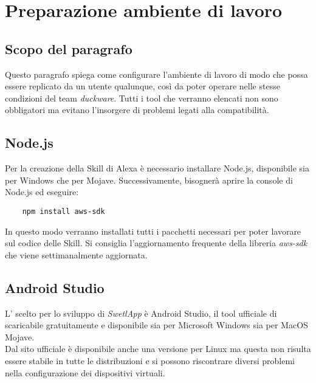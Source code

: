 \pagebreak

\section{Preparazione ambiente di lavoro}
\label{sec:ambientelavoro}
\subsection{Scopo del paragrafo}
Questo paragrafo spiega come configurare l'ambiente di lavoro di modo che possa essere replicato da un utente qualunque, così da poter operare nelle stesse condizioni del team \textit{duckware}. Tutti i tool che verranno elencati non sono obbligatori ma evitano l'insorgere di problemi legati alla compatibilità.

\subsection{Node.js}
Per la creazione della Skill di Alexa è necessario installare Node.js, disponibile sia per Windows che per Mojave. Successivamente, bisognerà aprire la console di Node.js ed eseguire:
\begin{verbatim}
    npm install aws-sdk
\end{verbatim}
In questo modo verranno installati tutti i pacchetti necessari per poter lavorare sul codice delle Skill. Si consiglia l'aggiornamento frequente della libreria \emph{aws-sdk} che viene settimanalmente aggiornata.

\subsection{Android Studio}
L' scelto per lo sviluppo di \textit{SwetlApp} è Android Studio, il tool ufficiale di  scaricabile gratuitamente e disponibile sia per Microsoft Windows sia per MacOS Mojave.\\[0.25cm]
Dal sito ufficiale è disponibile anche una versione per Linux ma questa non risulta essere stabile in tutte le distribuzioni e si possono riscontrare diversi problemi nella configurazione dei dispositivi virtuali.

